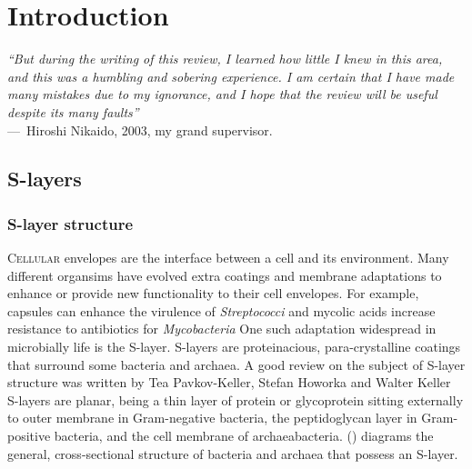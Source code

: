%
\acresetall{}

\chapter{Introduction}
\label{ch:Introduction}

\begin{epigraph} \emph{``But during the writing of this review, I learned how little I knew in this
    area, and this was a humbling and sobering experience. I am certain that I have made many
    mistakes due to my ignorance, and I hope that the review will be useful despite its many faults''}\\
  ---~Hiroshi Nikaido, 2003, my grand supervisor.
\end{epigraph}
\section{S-layers} \label{sec:intro-slayers}
\subsection{S-layer structure} %
\label{sub:s_layer_structure} \lettrine[lines=2]{C}{ellular} envelopes are the interface between a
cell and its environment. Many different organsims have evolved extra coatings and membrane
adaptations to enhance or provide new functionality to their cell envelopes. For example, capsules
can enhance the virulence of \textit{Streptococci} and mycolic
acids increase resistance to antibiotics for \textit{Mycobacteria}
One such adaptation widespread in microbially life is the \ac{S-layer}. \Acp{S-layer} are
proteinacious, para-crystalline coatings that surround some bacteria and
archaea. A good review on the subject of \ac{S-layer} structure was written by Tea Pavkov-Keller, Stefan Howorka and Walter Keller \Acp{S-layer} are planar, being a thin layer of protein or glycoprotein sitting externally to outer membrane in Gram-negative bacteria, the
peptidoglycan layer in Gram-positive bacteria, and the cell membrane of
archaeabacteria.  () diagrams the general,
cross-sectional structure of bacteria and archaea that possess an S-layer.

